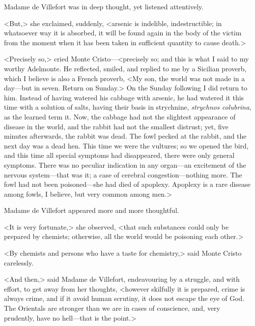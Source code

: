  Madame de Villefort was in deep thought, yet listened attentively. 

 <But,> she exclaimed, suddenly, <arsenic is indelible, indestructible; in whatsoever way it is absorbed, it will be found again in the body of the victim from the moment when it has been taken in sufficient quantity to cause death.> 

 <Precisely so,> cried Monte Cristo—<precisely so; and this is what I said to my worthy Adelmonte. He reflected, smiled, and replied to me by a Sicilian proverb, which I believe is also a French proverb, <My son, the world was not made in a day—but in seven. Return on Sunday.> On the Sunday following I did return to him. Instead of having watered his cabbage with arsenic, he had watered it this time with a solution of salts, having their basis in strychnine, \textit{strychnos colubrina}, as the learned term it. Now, the cabbage had not the slightest appearance of disease in the world, and the rabbit had not the smallest distrust; yet, five minutes afterwards, the rabbit was dead. The fowl pecked at the rabbit, and the next day was a dead hen. This time we were the vultures; so we opened the bird, and this time all special symptoms had disappeared, there were only general symptoms. There was no peculiar indication in any organ—an excitement of the nervous system—that was it; a case of cerebral congestion—nothing more. The fowl had not been poisoned—she had died of apoplexy. Apoplexy is a rare disease among fowls, I believe, but very common among men.> 

 Madame de Villefort appeared more and more thoughtful. 

 <It is very fortunate,> she observed, <that such substances could only be prepared by chemists; otherwise, all the world would be poisoning each other.> 

 <By chemists and persons who have a taste for chemistry,> said Monte Cristo carelessly. 

 <And then,> said Madame de Villefort, endeavouring by a struggle, and with effort, to get away from her thoughts, <however skilfully it is prepared, crime is always crime, and if it avoid human scrutiny, it does not escape the eye of God. The Orientals are stronger than we are in cases of conscience, and, very prudently, have no hell—that is the point.>  
 
